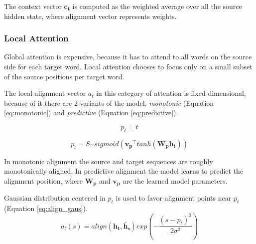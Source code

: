 The context vector $\mathbf{c_t}$ is computed as the weighted average over all the source hidden state, where alignment vector represents weights.

\subsubsection{Local Attention}
Global attention is expensive, because it has to attend to all words on the source side for each target word. Local attention chooses to focus only on a small subset of the source positions per target word.

The local alignment vector $a_t$ in this category of attention is fixed-dimensional, because of it there are 2 variants of the model, \textit{monotonic} (Equation \ref{eq:monotonic}) and \textit{predictive} (Equation \ref{eq:predictive}).

\begin{equation} \label{eq:monotonic}
p_t = t
\end{equation}

\begin{equation} \label{eq:predictive}
p_t = S \cdot sigmoid(\mathbf{v_p}^\intercal tanh(\mathbf{W_p} \mathbf{h_t}))
\end{equation}

In monotonic alignment the source and target sequences are roughly monotonically aligned. In predictive alignment the model learns to predict the alignment position, where $\mathbf{W_p}$ and $\mathbf{v_p}$ are the learned model parameters.

Gaussian distribution centered in $p_t$ is used to favor alignment points near $p_t$ (Equation \ref{eq:align_gaus}).
\begin{equation} \label{eq:align_gaus}
a_t(s) = align(\mathbf{h_t}, \mathbf{\bar{h}_s}) exp(-\frac{(s-p_t)^2}{2\sigma^2})
\end{equation}

